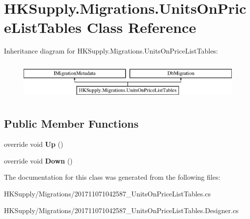 \hypertarget{class_h_k_supply_1_1_migrations_1_1_units_on_price_list_tables}{}\section{H\+K\+Supply.\+Migrations.\+Units\+On\+Price\+List\+Tables Class Reference}
\label{class_h_k_supply_1_1_migrations_1_1_units_on_price_list_tables}
Inheritance diagram for H\+K\+Supply.\+Migrations.\+Units\+On\+Price\+List\+Tables\+:\begin{figure}[H]
\begin{center}
\leavevmode
\includegraphics[height=2.000000cm]{class_h_k_supply_1_1_migrations_1_1_units_on_price_list_tables}
\end{center}
\end{figure}
\subsection*{Public Member Functions}
\begin{DoxyCompactItemize}
\item 
\mbox{\label{class_h_k_supply_1_1_migrations_1_1_units_on_price_list_tables_ae95e8e756b2273b4d46013313d1d100f}} 
override void {\bfseries Up} ()
\item 
\mbox{\label{class_h_k_supply_1_1_migrations_1_1_units_on_price_list_tables_a6dcadbd741fc87df8e9d444145434169}} 
override void {\bfseries Down} ()
\end{DoxyCompactItemize}


The documentation for this class was generated from the following files\+:\begin{DoxyCompactItemize}
\item 
H\+K\+Supply/\+Migrations/201711071042587\+\_\+\+Units\+On\+Price\+List\+Tables.\+cs\item 
H\+K\+Supply/\+Migrations/201711071042587\+\_\+\+Units\+On\+Price\+List\+Tables.\+Designer.\+cs\end{DoxyCompactItemize}

